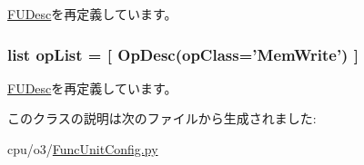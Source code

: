 \hyperlink{classFuncUnit_1_1FUDesc_adf167b42e49fa9d4114bff901e1b1c29}{FUDesc}を再定義しています。\hypertarget{classFuncUnitConfig_1_1WritePort_a31b2f9e3ac9a504397b140f513c469cc}{
\subsubsection[{opList}]{\setlength{\rightskip}{0pt plus 5cm}list {\bf opList} = \mbox{[} {\bf OpDesc}(opClass='MemWrite') \mbox{]}}}
\label{classFuncUnitConfig_1_1WritePort_a31b2f9e3ac9a504397b140f513c469cc}


\hyperlink{classFuncUnit_1_1FUDesc_aa7a0c51c9e0149c27f9e38f86005dfbe}{FUDesc}を再定義しています。

このクラスの説明は次のファイルから生成されました:\begin{DoxyCompactItemize}
\item 
cpu/o3/\hyperlink{FuncUnitConfig_8py}{FuncUnitConfig.py}\end{DoxyCompactItemize}
